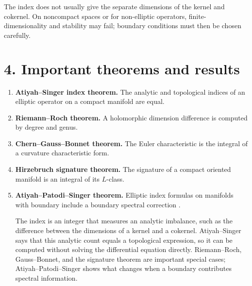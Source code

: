 The index does not usually give the separate dimensions of the kernel and cokernel. On noncompact spaces or for non-elliptic operators, finite-dimensionality and stability may fail; boundary conditions must then be chosen carefully.

\section*{4. Important theorems and results}
\begin{enumerate}[leftmargin=*,itemsep=0.35em]
\item \textbf{Atiyah--Singer index theorem.} The analytic and topological indices of an elliptic operator on a compact manifold are equal.

\item \textbf{Riemann--Roch theorem.} A holomorphic dimension difference is computed by degree and genus.

\item \textbf{Chern--Gauss--Bonnet theorem.} The Euler characteristic is the integral of a curvature characteristic form.

\item \textbf{Hirzebruch signature theorem.} The signature of a compact oriented manifold is an integral of its $L$-class.

\item \textbf{Atiyah--Patodi--Singer theorem.} Elliptic index formulas on manifolds with boundary include a boundary spectral correction \cite{index_theory_ref4}.

The index is an integer that measures an analytic imbalance, such as the difference between the dimensions of a kernel and a cokernel. Atiyah--Singer says that this analytic count equals a topological expression, so it can be computed without solving the differential equation directly. Riemann--Roch, Gauss--Bonnet, and the signature theorem are important special cases; Atiyah--Patodi--Singer shows what changes when a boundary contributes spectral information.
\end{enumerate}

\theoryapplications
{}
